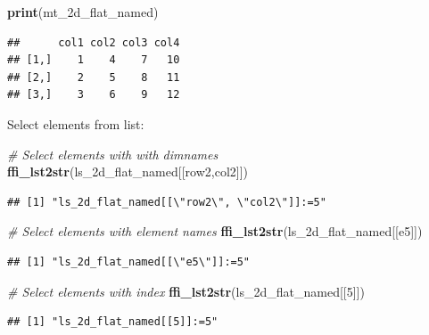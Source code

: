 \documentclass[
]{book}
\newenvironment{Shaded}{\begin{snugshade}}{\end{snugshade}}
\newcommand{\CommentTok}[1]{\textcolor[rgb]{0.56,0.35,0.01}{\textit{#1}}}
\newcommand{\DecValTok}[1]{\textcolor[rgb]{0.00,0.00,0.81}{#1}}
\newcommand{\KeywordTok}[1]{\textcolor[rgb]{0.13,0.29,0.53}{\textbf{#1}}}
\newcommand{\NormalTok}[1]{#1}
\newcommand{\StringTok}[1]{\textcolor[rgb]{0.31,0.60,0.02}{#1}}
\begin{document}
\begin{Shaded}
\begin{Highlighting}[]
\KeywordTok{print}\NormalTok{(mt\_2d\_flat\_named)}
\end{Highlighting}
\end{Shaded}

\begin{verbatim}
##      col1 col2 col3 col4
## [1,]    1    4    7   10
## [2,]    2    5    8   11
## [3,]    3    6    9   12
\end{verbatim}

Select elements from list:

\begin{Shaded}
\begin{Highlighting}[]
\CommentTok{\# Select elements with with dimnames}
\KeywordTok{ffi\_lst2str}\NormalTok{(ls\_2d\_flat\_named[[}\StringTok{\textquotesingle{}row2\textquotesingle{}}\NormalTok{,}\StringTok{\textquotesingle{}col2\textquotesingle{}}\NormalTok{]])}
\end{Highlighting}
\end{Shaded}

\begin{verbatim}
## [1] "ls_2d_flat_named[[\"row2\", \"col2\"]]:=5"
\end{verbatim}

\begin{Shaded}
\begin{Highlighting}[]
\CommentTok{\# Select elements with element names}
\KeywordTok{ffi\_lst2str}\NormalTok{(ls\_2d\_flat\_named[[}\StringTok{\textquotesingle{}e5\textquotesingle{}}\NormalTok{]])}
\end{Highlighting}
\end{Shaded}

\begin{verbatim}
## [1] "ls_2d_flat_named[[\"e5\"]]:=5"
\end{verbatim}

\begin{Shaded}
\begin{Highlighting}[]
\CommentTok{\# Select elements with index}
\KeywordTok{ffi\_lst2str}\NormalTok{(ls\_2d\_flat\_named[[}\DecValTok{5}\NormalTok{]])}
\end{Highlighting}
\end{Shaded}

\begin{verbatim}
## [1] "ls_2d_flat_named[[5]]:=5"
\end{verbatim}
\end{document}

